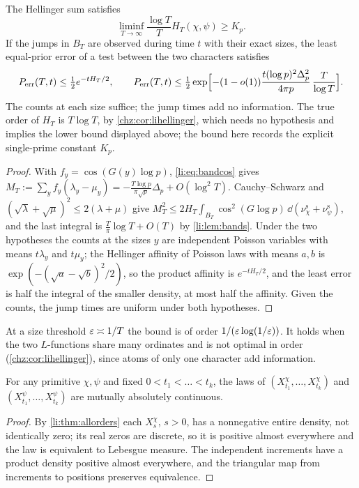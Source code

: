 \begin{remark}\label{li:thm:information}
The Hellinger sum satisfies
\[
 \liminf_{T\to\infty}\frac{\log T}TH_T(\chi,\psi)\ge K_p.
\]
If the jumps in $B_T$ are observed during time $t$ with
their exact sizes, the least equal-prior error of a test between the two characters satisfies
\[
 P_{\rm err}(T,t)\le\tfrac12e^{-tH_T/2},\qquad
 P_{\rm err}(T,t)\le\tfrac12\exp\Bigl[-(1-o(1))\frac{t(\log p)^2\Delta_p^2}{4\pi p}\,\frac T{\log T}\Bigr].
\]
The counts at each size suffice; the jump times add no information. The true order of $H_T$ is
$T\log T$, by \cref{chz:cor:lihellinger}, which needs no hypothesis and implies the lower bound displayed
above; the bound here records the explicit single-prime constant $K_p$.
\end{remark}

\begin{proof}
With $f_y=\cos(G(y)\log p)$, \eqref{li:eq:bandcos} gives
$M_T:=\sum_yf_y(\lambda_y-\mu_y)=-\frac{T\log p}{\pi\sqrt p}\Delta_p+O(\log^2T)$. Cauchy--Schwarz and
$(\sqrt\lambda+\sqrt\mu)^2\le2(\lambda+\mu)$ give $M_T^2\le2H_T\int_{B_T}\cos^2(G\log p)\,\dd(\nu^{\mathrm s}_\chi+\nu^{\mathrm s}_\psi)$, and the last integral is
$\frac T\pi\log T+O(T)$ by \cref{li:lem:bands}. Under the two hypotheses the counts at the sizes $y$ are
independent Poisson variables with means $t\lambda_y$ and $t\mu_y$; the Hellinger affinity of Poisson laws with
means $a,b$ is $\exp(-(\sqrt a-\sqrt b)^2/2)$, so the product affinity is $e^{-tH_T/2}$, and the least error is half
the integral of the smaller density, at most half the affinity. Given the counts, the jump times are
uniform under both hypotheses.
\end{proof}

At a size threshold $\varepsilon\asymp1/T$ the bound is of order $1/(\varepsilon\log(1/\varepsilon))$. It holds when the two
$L$-functions share many ordinates and is not optimal in order (\cref{chz:cor:lihellinger}), since atoms
of only one character add information.

\begin{theorem}\label{li:thm:grid}
For any primitive $\chi,\psi$ and fixed $0<t_1<\dots<t_k$, the laws of $(X^\chi_{t_1},\dots,X^\chi_{t_k})$ and
$(X^\psi_{t_1},\dots,X^\psi_{t_k})$ are mutually absolutely continuous.
\end{theorem}

\begin{proof}
By \cref{li:thm:allorders} each $X^\chi_s$, $s>0$, has a nonnegative entire density, not identically zero; its
real zeros are discrete, so it is positive almost everywhere and the law is equivalent to Lebesgue
measure. The independent increments have a product density positive almost everywhere, and the
triangular map from increments to positions preserves equivalence.
\end{proof}

